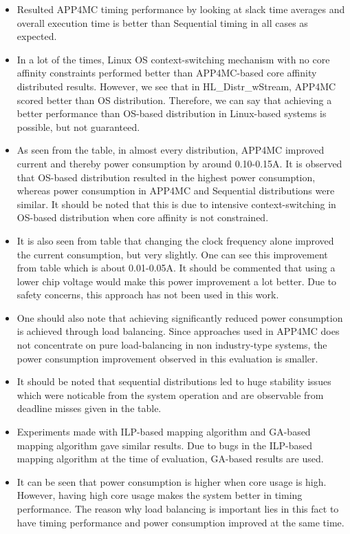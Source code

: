 \begin{itemize}
	\item Resulted APP4MC timing performance by looking at slack time averages and overall execution time is better than Sequential timing in all cases as expected.
	\item In a lot of the times, Linux OS context-switching mechanism with no core affinity constraints performed better than APP4MC-based core affinity distributed results. However, we see that in HL{\_}Distr{\_}wStream, APP4MC scored better than OS distribution. Therefore, we can say that achieving a better performance than OS-based distribution in Linux-based systems is possible, but not guaranteed.
	\item As seen from the table, in almost every distribution, APP4MC improved current and thereby power consumption by around 0.10-0.15A. It is observed that OS-based distribution resulted in the highest power consumption, whereas power consumption in APP4MC and Sequential distributions were similar. It should be noted that this is due to intensive context-switching in OS-based distribution when core affinity is not constrained.
	\item It is also seen from table that changing the clock frequency alone improved the current consumption, but very slightly. One can see this improvement from table which is about 0.01-0.05A. It should be commented that using a lower chip voltage would make this power improvement a lot better. Due to safety concerns, this approach has not been used in this work. 
	\item One should also note that achieving significantly reduced power consumption is achieved through load balancing. Since approaches used in APP4MC does not concentrate on pure load-balancing in non industry-type systems, the power consumption improvement observed in this evaluation is smaller.
	\item It should be noted that sequential distributions led to huge stability issues which were noticable from the system operation and are observable from deadline misses given in the table.
	\item Experiments made with ILP-based mapping algorithm and GA-based mapping algorithm gave similar results. Due to bugs in the ILP-based mapping algorithm at the time of evaluation, GA-based results are used.
	\item It can be seen that power consumption is higher when core usage is high. However, having high core usage makes the system better in timing performance. The reason why load balancing is important lies in this fact to have timing performance and power consumption improved at the same time.

\end{itemize}
